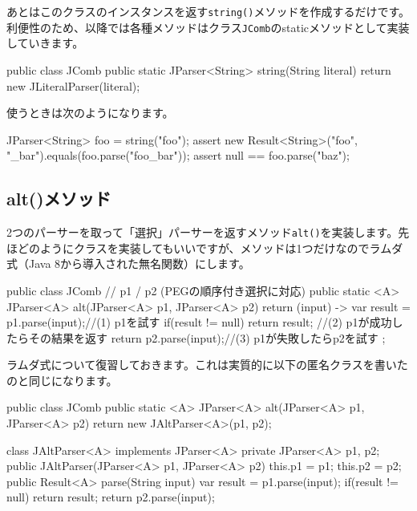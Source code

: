 あとはこのクラスのインスタンスを返す\texttt{string()}メソッドを作成するだけです。利便性のため、以降では各種メソッドはクラス\texttt{JComb}のstaticメソッドとして実装していきます。

\begin{codescreen}{}
public class JComb {
  public static JParser<String> string(String literal) {
    return new JLiteralParser(literal);
  }
}
\end{codescreen}

使うときは次のようになります。

\begin{codescreen}{}
JParser<String> foo = string("foo");
assert new Result<String>("foo", "_bar").equals(foo.parse("foo_bar"));
assert null == foo.parse("baz");
\end{codescreen}

\subsection{alt()メソッド}

2つのパーサーを取って「選択」パーサーを返すメソッド\texttt{alt()}を実装します。先ほどのようにクラスを実装してもいいですが、メソッドは1つだけなのでラムダ式（Java
8から導入された無名関数）にします。

\begin{codescreen}{}
public class JComb {
    // p1 / p2 (PEGの順序付き選択に対応)
    public static <A> JParser<A> alt(JParser<A> p1, JParser<A> p2) {
        return (input) -> {
            var result = p1.parse(input);//(1) p1を試す
            if(result != null) return result;
                                   //(2) p1が成功したらその結果を返す
            return p2.parse(input);//(3) p1が失敗したらp2を試す
        };
    }
}
\end{codescreen}

ラムダ式について復習しておきます。これは実質的に以下の匿名クラスを書いたのと同じになります。

\begin{codescreen}{}
public class JComb {
    public static <A> JParser<A> alt(JParser<A> p1, JParser<A> p2) {
        return new JAltParser<A>(p1, p2);
    }
}

class JAltParser<A> implements JParser<A> {
  private JParser<A> p1, p2;
  public JAltParser(JParser<A> p1, JParser<A> p2) {
    this.p1 = p1;
    this.p2 = p2;
  }
  public Result<A> parse(String input) {
    var result = p1.parse(input);
    if(result != null) return result;
    return p2.parse(input);
  }
}
\end{codescreen}

